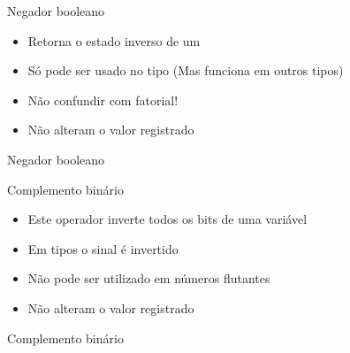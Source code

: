 \documentclass[11pt]{beamer}
\begin{document}

	\begin{frame}{Negador booleano}
		\begin{itemize}
			\presentationPause\item Retorna o estado inverso de um 
			\presentationPause\item Só pode ser usado no tipo  \presentationPause(Mas funciona em outros tipos)
			\presentationPause\item Não confundir com fatorial!
			\presentationPause\item Não alteram o valor registrado
		\end{itemize}
		\presentationPause
	\end{frame}\begin{frame}{Negador booleano}
		
	\end{frame}

	\begin{frame}{Complemento binário}
			\begin{itemize}
				\presentationPause\item Este operador inverte todos os bits de uma variável
				\presentationPause\item Em tipos  o sinal é invertido
				\presentationPause\item Não pode ser utilizado em números flutantes
				\presentationPause\item Não alteram o valor registrado
			\end{itemize}
			\presentationPause
	\end{frame}\begin{frame}{Complemento binário}
		
	\end{frame}
\end{document}
